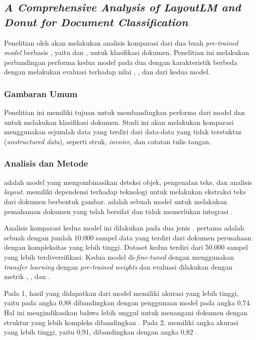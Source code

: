 \subsection{\textit{A Comprehensive Analysis of LayoutLM and Donut for Document \linebreak Classification}}
\label{sec:penelitian-1}
Penelitian oleh \cite{bajrami2023comprehensive}  akan melakukan analisis komparasi dari dua buah \textit{pre-trained model} berbasis \transformer{}, yaitu \layoutlm{} dan \donut, untuk klasifikasi dokumen. Penelitian ini melakukan perbandingan performa kedua model pada dua \dataset{} dengan karakteristik berbeda dengan melakukan evaluasi 
terhadap nilai \accuracy, \precision, dan \fscore{} dari kedua model. 

\subsubsection{Gambaran Umum}
Penelitian ini memiliki tujuan untuk membandingkan performa dari model \donut{} dan \layoutlm{} untuk melakukan klasifikasi dokumen. Studi ini akan 
melakukan komparasi menggunakan sejumlah data yang terdiri dari data-data yang tidak terstuktur (\textit{unstructured data}), seperti struk, \textit{invoice}, dan catatan tulis tangan.

\subsubsection{Analisis dan Metode}
\layoutlm{} adalah model yang mengombinasikan deteksi objek, pengenalan teks, dan analisis \textit{layout}. \layoutlm{} memiliki dependensi terhadap teknologi \ocr{} untuk melakukan ekstraksi teks dari dokumen berbentuk gambar. \donut{} adalah sebuah model \transformer{} untuk melakukan 
pemahaman dokumen yang telah bersifat \sotafull{} dan tidak memerlukan integrasi \ocr.

Analisis komparasi kedua model ini dilakukan pada dua jenis \dataset. \datasetfl{} pertama adalah sebuah \dataset{} dengan jumlah 10.000 sampel data yang terdiri dari dokumen perusahaan dengan kompleksitas yang lebih tinggi. Dataset 
kedua terdiri dari 50.000 sampel yang lebih terdiversifikasi. Kedua model di-\textit{fine-tuned} dengan menggunakan \textit{transfer learning} dengan \textit{pre-trained weights} dan evaluasi dilakukan dengan metrik \accuracy, \precision, dan \fscore.  

Pada \dataset{} 1, hasil yang didapatkan dari model \layoutlm{} memiliki akurasi yang lebih tinggi, yaitu pada angka 0,88 dibandingkan dengan penggunaan model \donut{} pada angka 0,74. Hal ini mengindikasikan bahwa \layoutlm{} lebih unggul untuk menangani dokumen dengan struktur yang lebih kompleks dibandingkan \donut{}. Pada \dataset{} 2, \donut{} memiliki angka akurasi yang lebih tinggi, yaitu 0,91, dibandingkan \layoutlm{} dengan angka 0,82 \parencite{bajrami2023comprehensive}.

